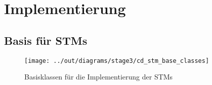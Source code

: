 \chapter{Implementierung}\label{ch:implementierung}


\section{Basis für STMs}\label{sec:basis-fuer-stms}

\begin{figure}[h]
    \centering
    \texttt{[image: ../out/diagrams/stage3/cd\_stm\_base\_classes]}
    \caption{Basisklassen für die Implementierung der STMs}
    \label{fig:cd-stm-base}
\end{figure}

